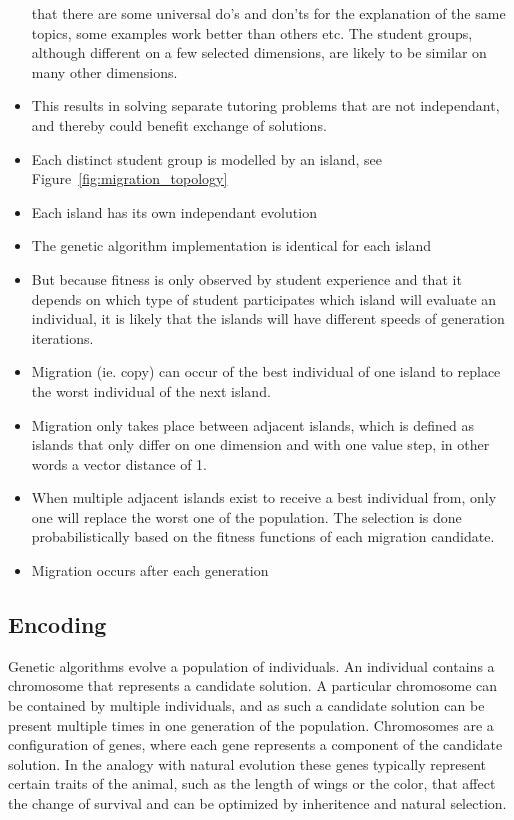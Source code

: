 \begin{itemize}
		that there are some universal do's and don'ts for the explanation of
		the same topics, some examples work better than others etc. The student
		groups, although different on a few selected dimensions, are likely to
		be similar on many other dimensions.
	\item This results in solving separate tutoring problems that are not
		independant, and thereby could benefit exchange of solutions.
	\item Each distinct student group is modelled by an island, see
		Figure~\ref{fig:migration_topology}
	\item Each island has its own independant evolution
	\item The genetic algorithm implementation is identical for each island
	\item But because fitness is only observed by student experience and that
		it depends on which type of student participates which island will
		evaluate an individual, it is likely that the islands will have
		different speeds of generation iterations.
	\item Migration (ie. copy) can occur of the best individual of one island
		to replace the worst individual of the next island.
	\item Migration only takes place between adjacent islands, which is defined
		as islands that only differ on one dimension and with one value step,
		in other words a vector distance of 1.
	\item When multiple adjacent islands exist to receive a best individual
		from, only one will replace the worst one of the population. The
		selection is done probabilistically based on the fitness functions of
		each migration candidate.
	\item Migration occurs after each generation
\end{itemize}
\subsection{Encoding}
Genetic algorithms evolve a population of individuals. An individual contains a
chromosome that represents a candidate solution. A particular chromosome can be contained by
multiple individuals, and as such a candidate solution can be present multiple
times in one generation of the population. Chromosomes are a configuration of
genes, where each gene represents a component of the candidate solution. In the
analogy with natural evolution these genes typically represent certain traits
of the animal, such as the length of wings or the color, that affect the change
of survival and can be optimized by inheritence and natural selection.

